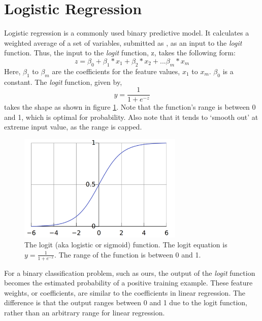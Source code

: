 \section{Logistic Regression}
Logistic regression is a commonly used binary predictive model. It calculates a weighted average of a set of variables, submitted as \cov, as an input to the \textit{logit} function. Thus, the input to the \textit{logit} function, z, takes the following form:
\begin{equation}
 z = \beta_0 + \beta_1 * x_1 + \beta_2 * x_2 + ... \beta_m * x_m  %
 \end{equation}
Here, $\beta_1$ to $\beta_m$ are the coefficients for the feature values, $x_1$ to $x_m$. $\beta_0$ is a constant. The \textit{logit} function, given by, 
\begin{equation}\label{eq:logit}
 y = \frac{1}{1 + e ^{-z}}
 \end{equation}
takes the shape as shown in figure \ref{fig:logit}. Note that the function's range is between 0 and 1, which is optimal for probability. Also note that it tends to `smooth out' at extreme input value, as the range is capped. 

\begin{figure}[ht!]
  \caption{The logit (aka logistic or sigmoid) function. The logit equation is $ y = \frac{1}{1 + e ^{-x}}$. The range of the function is between 0 and 1.}\label{fig:logit}
  \centering
    \includegraphics[width=0.7\textwidth]{figures/logit.png}
\end{figure}

For a binary classification problem, such as ours, the output of the \textit{logit} function becomes the estimated probability of a positive training example. These feature weights, or coefficients, are similar to the coefficients in linear regression. The difference is that the output ranges between 0 and 1 due to the logit function, rather than an arbitrary range for linear regression.

